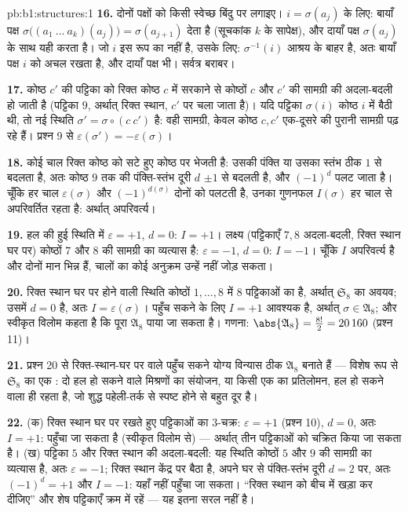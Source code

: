 \begin{solution}{pb:b1:structures:1}
\textbf{16.} दोनों पक्षों को किसी स्वेच्छ बिंदु पर लगाइए। $i = \sigma(a_j)$
के लिए: बायाँ पक्ष $\sigma\bigl((a_1\ \dots\ a_k)(a_j)\bigr) =
\sigma(a_{j+1})$ देता है (सूचकांक $k$ के सापेक्ष), और दायाँ पक्ष
$\sigma(a_j)$ के साथ यही करता है। जो $i$ इस रूप का नहीं है, उसके लिए:
$\sigma^{-1}(i)$ आश्रय के बाहर है, अतः बायाँ पक्ष $i$ को अचल रखता है, और
दायाँ पक्ष भी। सर्वत्र बराबर।

\textbf{17.} कोष्ठ $c'$ की पट्टिका को रिक्त कोष्ठ $c$ में सरकाने से कोष्ठों
$c$ और $c'$ की सामग्री की अदला-बदली हो जाती है (पट्टिका $9$, अर्थात् रिक्त
स्थान, $c'$ पर चला जाता है)। यदि पट्टिका $\sigma(i)$ कोष्ठ $i$ में बैठी थी,
तो नई स्थिति $\sigma' = \sigma \circ (c\ c')$ है: वही सामग्री, केवल कोष्ठ
$c, c'$ एक-दूसरे की पुरानी सामग्री पढ़ रहे हैं। प्रश्न 9 से
$\varepsilon(\sigma') = -\varepsilon(\sigma)$।

\textbf{18.} कोई चाल रिक्त कोष्ठ को सटे हुए कोष्ठ पर भेजती है: उसकी पंक्ति
या उसका स्तंभ ठीक $1$ से बदलता है, अतः कोष्ठ $9$ तक की पंक्ति-स्तंभ दूरी $d$
$\pm1$ से बदलती है, और $(-1)^d$ पलट जाता है। चूँकि हर चाल
$\varepsilon(\sigma)$ और $(-1)^{d(\sigma)}$ दोनों को पलटती है, उनका गुणनफल
$I(\sigma)$ हर चाल से अपरिवर्तित रहता है: अर्थात् अपरिवर्त्य।

\textbf{19.} हल की हुई स्थिति में $\varepsilon = +1$, $d = 0$: $I = +1$।
लक्ष्य (पट्टिकाएँ $7, 8$ अदला-बदली, रिक्त स्थान घर पर) कोष्ठों $7$ और $8$ की
सामग्री का व्यत्यास है: $\varepsilon = -1$, $d = 0$: $I = -1$। चूँकि $I$
अपरिवर्त्य है और दोनों मान भिन्न हैं, चालों का कोई अनुक्रम उन्हें नहीं जोड़
सकता।

\textbf{20.} रिक्त स्थान घर पर होने वाली स्थिति कोष्ठों $1, \dots, 8$ में
$8$ पट्टिकाओं का  है, अर्थात् $\mathfrak S_8$ का अवयव; उसमें $d = 0$
है, अतः $I = \varepsilon(\sigma)$। पहुँच सकने के लिए $I = +1$ आवश्यक है,
अर्थात् $\sigma \in \mathfrak A_8$; और स्वीकृत विलोम कहता है कि पूरा
$\mathfrak A_8$ पाया जा सकता है। गणना: $\abs{\mathfrak A_8} = \frac{8!}2 =
20\,160$ (प्रश्न 11)।

\textbf{21.} प्रश्न 20 से रिक्त-स्थान-घर पर वाले पहुँच सकने योग्य विन्यास
ठीक $\mathfrak A_8$ बनाते हैं --- विशेष रूप से $\mathfrak S_8$ का एक
\emph{}: दो हल हो सकने वाले मिश्रणों का संयोजन, या किसी एक का
प्रतिलोमन, हल हो सकने वाला ही रहता है, जो शुद्ध पहेली-तर्क से स्पष्ट होने से
बहुत दूर है।

\textbf{22.} (क) रिक्त स्थान घर पर रखते हुए पट्टिकाओं का $3$-चक्र:
$\varepsilon = +1$ (प्रश्न 10), $d = 0$, अतः $I = +1$: पहुँचा जा सकता है
(स्वीकृत विलोम से) --- अर्थात् तीन पट्टिकाओं को चक्रित किया जा सकता है। (ख)
पट्टिका $5$ और रिक्त स्थान की अदला-बदली: यह स्थिति कोष्ठों $5$ और $9$ की
सामग्री का व्यत्यास है, अतः $\varepsilon = -1$; रिक्त स्थान केंद्र पर बैठा
है, अपने घर से पंक्ति-स्तंभ दूरी $d = 2$ पर, अतः $(-1)^d = +1$ और $I = -1$:
यहाँ नहीं पहुँचा जा सकता। ``रिक्त स्थान को बीच में खड़ा कर दीजिए'' और शेष
पट्टिकाएँ क्रम में रहें --- यह इतना सरल नहीं है।


\end{solution}
